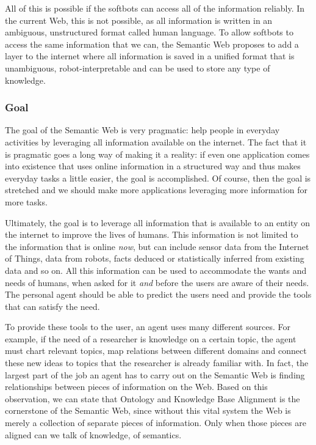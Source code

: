 \documentclass{article}
\begin{document}
 All of this is possible if the softbots can access all of the information reliably. In the current Web, this is not possible, as all information is written in an ambiguous, unstructured format called human language. To allow softbots to access the same information that we can, the Semantic Web proposes to add a layer to the internet where all information is saved in a unified format that is unambiguous, robot-interpretable and can be used to store any type of knowledge.
 
 \subsubsection{Goal}
 The goal of the Semantic Web is very pragmatic: help people in everyday activities by leveraging all information available on the internet. The fact that it is pragmatic goes a long way of making it a reality: if even one application comes into existence that uses online information in a structured way and thus makes everyday tasks a little easier, the goal is accomplished. Of course, then the goal is stretched and we should make more applications leveraging more information for more tasks.
 
 Ultimately, the goal is to leverage all information that is available to an entity on the internet to improve the lives of humans. This information is not limited to the information that is online \emph{now}, but can include sensor data from the Internet of Things, data from robots, facts deduced or statistically inferred from existing data and so on. All this information can be used to accommodate the wants and needs of humans, when asked for it \textit{and} before the users are aware of their needs. The personal agent should be able to predict the users need and provide the tools that can satisfy the need.
 
 To provide these tools to the user, an agent uses many different sources. For example, if the need of a researcher is knowledge on a certain topic, the agent must chart relevant topics, map relations between different domains and connect these new ideas to topics that the researcher is already familiar with. In fact, the largest part of the job an agent has to carry out on the Semantic Web is finding relationships between pieces of information on the Web. Based on this observation, we can state that Ontology and Knowledge Base Alignment is the cornerstone  of the Semantic Web, since without this vital system the Web is merely a collection of separate pieces of information. Only when those pieces are aligned can we talk of knowledge, of semantics.
 
\end{document}

